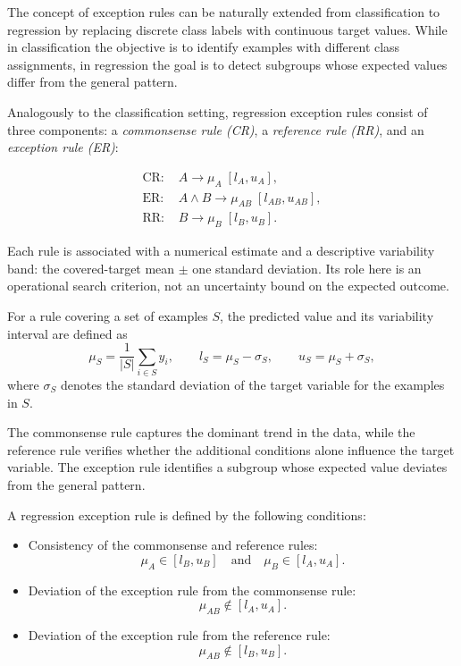 The concept of exception rules can be naturally extended from classification to regression by replacing discrete class labels with continuous target values. While in classification the objective is to identify examples with different class assignments, in regression the goal is to detect subgroups whose expected values differ from the general pattern.

Analogously to the classification setting, regression exception rules consist of three components: a \emph{commonsense rule (CR)}, a \emph{reference rule (RR)}, and an \emph{exception rule (ER)}:

\begin{center}
\[
\begin{aligned}
\text{CR: } & A \rightarrow \mu_{A} \; [l_{A}, u_{A}], \\
\text{ER: } & A \land B \rightarrow \mu_{AB} \; [l_{AB}, u_{AB}], \\
\text{RR: } & B \rightarrow \mu_{B} \; [l_{B}, u_{B}].
\end{aligned}
\]
\end{center}

Each rule is associated with a numerical estimate and a descriptive variability band: the covered-target mean $\pm$ one standard deviation. Its role here is an operational search criterion, not an uncertainty bound on the expected outcome.

For a rule covering a set of examples $S$, the predicted value and its variability interval are defined as
\[
\mu_S = \frac{1}{|S|}\sum_{i \in S} y_i, \qquad
l_S = \mu_S - \sigma_S, \qquad
u_S = \mu_S + \sigma_S,
\]
where $\sigma_S$ denotes the standard deviation of the target variable for the examples in $S$. \cite{Janssen2011} \cite{Sikora2012}

The commonsense rule captures the dominant trend in the data, while the reference rule verifies whether the additional conditions alone influence the target variable. The exception rule identifies a subgroup whose expected value deviates from the general pattern.

A regression exception rule is defined by the following conditions:

\begin{itemize}
\item Consistency of the commonsense and reference rules:
\[
\mu_{A} \in [l_{B}, u_{B}] \quad \text{and} \quad
\mu_{B} \in [l_{A}, u_{A}].
\]

\item Deviation of the exception rule from the commonsense rule:
\[
\mu_{AB} \notin [l_{A}, u_{A}].
\]

\item Deviation of the exception rule from the reference rule:
\[
\mu_{AB} \notin [l_{B}, u_{B}].
\]
\end{itemize}

